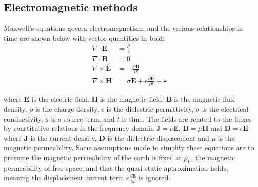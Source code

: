 \documentclass[letterpaper,11pt]{article}
\begin{document}

\subsection{Electromagnetic methods}
Maxwell's equations govern electromagnetism, and the various relationships in time are shown below with vector quantities in bold:
\begin{align}
\nabla \cdot \mathbf{E} &= \frac{\rho}{\epsilon} \label{eq:Gauss}\\
\nabla \cdot \mathbf{B} &= 0 \label{eq:divB}\\
\nabla \times \mathbf{E}  &= -\frac{\partial\mathbf{B}}{\partial t} \label{eq:Faraday}\\
\nabla \times \mathbf{H} &= \sigma \mathbf{E} + \epsilon\frac{\partial\mathbf{E}}{\partial t} + \mathbf{s}
\label{eq:Ampere}
\end{align}

where $\mathbf{E}$ is the electric field, $\mathbf{H}$ is the magnetic field, $ \mathbf{B} $ is the magnetic flux density, $ \rho $ is the charge density, $ \epsilon $ is the dielectric permittivity, $\sigma$ is the electrical conductivity, $ \mathbf{s} $ is a source term, and $ t $ is time. The fields are related to the fluxes by constitutive relations in the frequency domain $\mathbf{J} = \sigma \mathbf{E}$, $\mathbf{B} = \mu \mathbf{H}$ and $ \mathbf{D} = \epsilon \mathbf{E}$ where $\mathbf{J}$ is the current density, $ \mathbf{D} $ is the dielectric displacement and $ \mu $ is the magnetic permeability. Some assumptions made to simplify these equations are to presume the magnetic permeability of the earth is fixed at $ \mu_0 $, the magnetic permeability of free space, and that the quasi-static approximation holds, meaning the displacement current term $\epsilon\frac{\partial\mathbf{E}}{\partial t}$ is ignored. 
\end{document}
